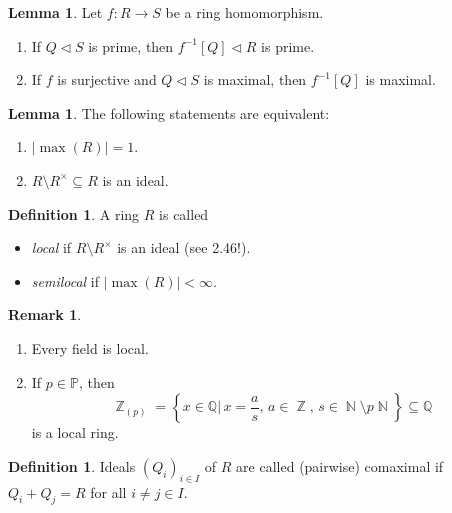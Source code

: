 \documentclass[12pt,a4paper]{report}
\theoremstyle{definition}
\newtheorem{lemma}[theorem]{Lemma}
\newtheorem{defn}[theorem]{Definition}
\newtheorem*{remark}{Remark}
\theoremstyle{num.custom-title}
\DeclareMathOperator{\N}{\mathbb{N}}
\DeclareMathOperator{\Z}{\mathbb{Z}}
\DeclareMathOperator{\sm}{\setminus}
\DeclareMathOperator{\sse}{\subseteq}
\newcommand{\Q}{\mathbb{Q}}
\renewcommand{\P}{\mathbb{P}}
\begin{document}
\begin{lemma}
Let $f:R \to S$ be a ring homomorphism.
\begin{enumerate}
\item If $Q \lhd S$ is prime, then $f^{-1}[Q] \lhd R$ is prime.
\item If $f$ is surjective and $Q \lhd S$ is maximal, then $f^{-1}[Q]$ is maximal.
\end{enumerate}
\end{lemma}

\begin{lemma}
The following statements are equivalent:
\begin{enumerate}
\item $|\max(R)|=1$.
\item $R \sm R^\times \sse R$ is an ideal.
\end{enumerate}
\end{lemma}

\begin{defn}
A ring $R$ is called
\begin{itemize}
\item \emph{local} if $R \sm R^\times$ is an ideal (see 2.46!).
\item \emph{semilocal} if $|\max(R)|<\infty$.
\end{itemize}
\end{defn}

\begin{remark}\ 
\begin{enumerate}
\item Every field is local.
\item If $p \in \P$, then
\[
\Z_{(p)} = \left\{ x \in \Q \Big| \, x=\frac{a}{s},\, a \in \Z,\, s \in \N \sm p\N\right\} \sse \Q
\]
is a local ring.
\end{enumerate}
\end{remark}

\begin{defn}
Ideals $(Q_i)_{i \in I}$ of $R$ are called (pairwise) comaximal if $Q_i+Q_j=R$ for all $i \neq j \in I$.
\end{defn}
\end{document}
